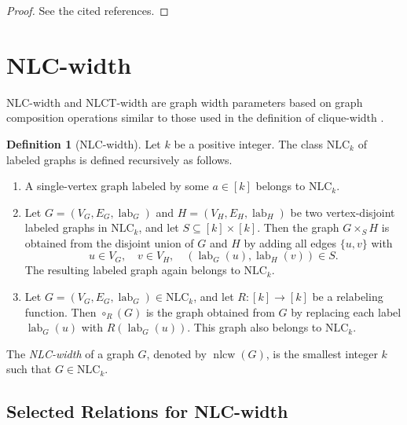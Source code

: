 \documentclass[10pt]{book}
\theoremstyle{definition}
\newtheorem{definition}[theorem]{Definition}
\DeclareMathOperator{\lab}{lab}
\begin{document}
\begin{proof}
See the cited references.
\end{proof}
\section{NLC-width}

NLC-width and NLCT-width are graph width parameters based on graph composition operations similar to those used in the definition of clique-width \cite{39,234}.

\begin{definition}[NLC-width]
\cite{39,234}
Let \(k\) be a positive integer. The class \(\mathrm{NLC}_k\) of labeled graphs is defined recursively as follows.
\begin{enumerate}
    \item A single-vertex graph labeled by some \(a\in [k]\) belongs to \(\mathrm{NLC}_k\).

    \item Let \(G=(V_G,E_G,\lab_G)\) and \(H=(V_H,E_H,\lab_H)\) be two vertex-disjoint labeled graphs in \(\mathrm{NLC}_k\), and let \(S\subseteq [k]\times [k]\).  
    Then the graph \(G\times_S H\) is obtained from the disjoint union of \(G\) and \(H\) by adding all edges \(\{u,v\}\) with
    \[
    u\in V_G,\quad v\in V_H,\quad (\lab_G(u),\lab_H(v))\in S.
    \]
    The resulting labeled graph again belongs to \(\mathrm{NLC}_k\).

    \item Let \(G=(V_G,E_G,\lab_G)\in \mathrm{NLC}_k\), and let \(R:[k]\to [k]\) be a relabeling function.  
    Then \(\circ_R(G)\) is the graph obtained from \(G\) by replacing each label \(\lab_G(u)\) with \(R(\lab_G(u))\).  
    This graph also belongs to \(\mathrm{NLC}_k\).
\end{enumerate}

The \emph{NLC-width} of a graph \(G\), denoted by \(\operatorname{nlcw}(G)\), is the smallest integer \(k\) such that \(G\in \mathrm{NLC}_k\).
\end{definition}

\subsection{Selected Relations for NLC-width}
\end{document}
